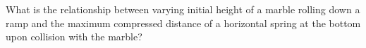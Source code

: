 What is the relationship between varying initial height of a marble rolling down a ramp and
the maximum compressed distance of a horizontal spring at the bottom upon collision with
the marble?